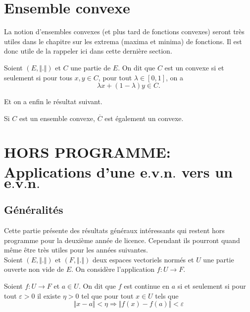 \documentclass[class=report,crop=false]{standalone}
\begin{document}
 \section{Ensemble convexe}\label{convexe1}
La notion d'ensembles convexes (et plus tard de fonctions convexes) seront très utiles dans le chapitre sur 
les extrema (maxima et minima) de fonctions. Il est donc utile de la rappeler ici dans cette dernière section.
 
 \begin{definition} \label{convexe}
\textcolor[rgb]{0.73,0.00,0.00}{
\noindent Soient $(E, \Vert. \Vert)$ et $C$ une partie de $E$. On dit que $C$ est un convexe si et seulement si
pour tous $x,y \in C$, pour tout $\lambda \in [0,1]$, on a
\begin{equation*}
\lambda x + (1-\lambda)y \in C.
\end{equation*}
}
\end{definition}

Et on a enfin le résultat suivant.

 \begin{proposition}
\textcolor[rgb]{0.50,0.00,0.25}{
Si $C$ est un ensemble convexe, $\overline{C}$ est également un convexe.
}
\end{proposition}
 

\section{\textbf{HORS PROGRAMME:} Applications d'une $\textbf{e.v.n.}$ vers un $\textbf{e.v.n.}$ }
\subsection{Généralités}
Cette partie présente des résultats généraux intéressants qui restent hors programme pour la deuxième année de licence.
 Cependant ils  pourront quand même être  très utiles pour les années suivantes.\\
$ $\\
Soient $(E,\Vert . \Vert)$ et $(F,\Vert . \Vert)$ deux espaces vectoriels normés et $U$ une partie ouverte non vide de $E$.
On considère l'application $f: U \rightarrow F$.

\begin{definition} 
\textcolor[rgb]{0.73,0.00,0.00}{
\noindent Soient $f: U \rightarrow F$ et $a \in U$. On dit que $f$ est continue en $a$ si et seulement si pour tout
$\varepsilon >0$ il existe $\eta>0$ tel que pour tout $x \in U $ tels que 
\begin{equation*}
\Vert x-a \Vert < \eta \Longrightarrow \Vert f(x)-f(a) \Vert < \varepsilon
\end{equation*}
}
\end{definition}
\end{document}
